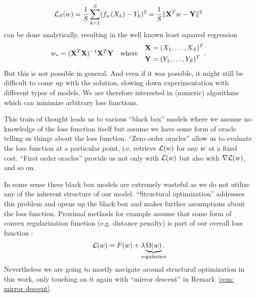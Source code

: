 \begin{align*}
	\mathcal{L}_{\mathcal{S}}(w)
	= \frac{1}{S}\sum_{k=1}^S (f_{w}(X_k)-Y_k)^2
	= \frac{1}{S}\| \mathbf{X}^Tw - \mathbf{Y}\|^2
\end{align*}
can be done analytically, resulting in the well known least squared
regression
\begin{align*}
	w_* = (\mathbf{X}^T\mathbf{X})^{-1}\mathbf{X}^T\mathbf{Y} \quad \text{where}\quad 
	\begin{aligned}
		\mathbf{X}&=(X_1,\dots,X_S)^T\\
		\mathbf{Y}&=(Y_1,\dots,Y_S)^T
	\end{aligned}.
\end{align*}
But this is not possible in general. And even if it was possible, it might still
be difficult to come up with the solution, slowing down experimentation
with different types of models. We are therefore interested in (numeric)
algorithms which can minimize arbitrary loss functions.

This train of thought leads us to various ``black box'' models where we assume
no knowledge of the loss function itself but assume we have some form of oracle
telling us things about the loss function. ``Zero order oracles'' allow us to
evaluate the loss function at a particular point, i.e. retrieve \(\mathcal{L}(w)\)
for any \(w\) at a fixed cost. ``First order oracles'' provide us not
only with \(\mathcal{L}(w)\) but also with \(\nabla\mathcal{L}(w)\), and so on. 

In some sense these black box models are extremely wasteful as we do not utilize
any of the inherent structure of our model. ``Structural optimization'' addresses
this problem and opens up the black box and makes further assumptions about
the loss function. Proximal methods for example assume that some form of convex
regularization function (e.g. distance penalty) is part of our overall loss
function \parencite[e.g.][]{bottouOptimizationMethodsLargeScale2018}:
\begin{align*}
	\Loss(\weights)
	= F(\weights) + \lambda \underbrace{\Omega(\weights)}_{\mathclap{\text{regularizer}}}.
\end{align*}
Nevertheless we are going to mostly navigate around structural optimization in
this work, only touching on it again with ``mirror descent'' in
Remark~\ref{rem: mirror descent}.

